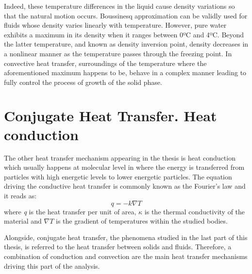 \noindent Indeed, these temperature differences in the liquid cause density variations so that the natural motion occurs. Boussinesq approximation can be validly used for fluids whose density varies linearly with temperature. However, pure water exhibits a maximum in its density when it ranges between 0ºC and 4ºC. Beyond the latter temperature, and known as density inversion point, density decreases in a nonlinear manner as the temperature passes through the freezing point. In convective heat transfer, surroundings of the temperature where the aforementioned maximum happens to be, behave in a complex manner leading to fully control the process of growth of the solid phase.


\section{Conjugate Heat Transfer. Heat conduction}
\setlength{\parindent}{0.5cm} The other heat transfer mechanism appearing in the thesis is heat conduction which usually happens at molecular level in where the energy is transferred from particles with high energetic levels to lower energetic particles. The equation driving the conductive heat transfer is commonly known as the Fourier's law and it reads as: 
\begin{equation}
	q=-k \nabla T
	\label{1.2}
\end{equation}
where \textit{q} is the heat transfer per unit of area, $\kappa$ is the thermal conductivity of the material and $\nabla T$ is the gradient of temperatures within the studied bodies.

\noindent Alongside, conjugate heat transfer, the phenomena studied in the last part of this thesis, is referred to the heat transfer between solids and fluids. Therefore, a combination of conduction and convection are the main heat transfer mechanisms driving this part of the analysis.


